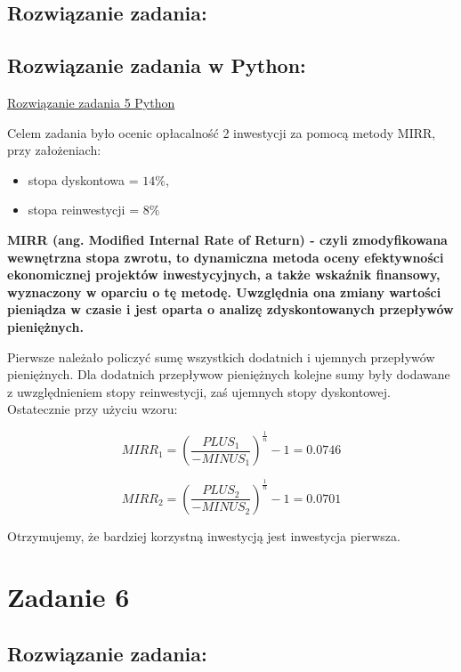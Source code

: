 \documentclass{article}
\begin{document}
	
	\subsection*{Rozwiązanie zadania:}
	
	
	\subsection*{Rozwiązanie zadania w Python:}
	\href{https://github.com/slaw999999999/OEI/blob/main/Zadanie1.ipynb}{Rozwiązanie zadania 5 Python}
	
	Celem zadania było ocenic opłacalność 2 inwestycji za pomocą metody MIRR, przy założeniach:
	
	\begin{itemize}
		\item 
		stopa
		dyskontowa = 
		$14 \%$,
		
		\item 
		stopa
		reinwestycji = 
		$8 \%$
	\end{itemize}

	\textbf{MIRR (ang. Modified Internal Rate of Return) - czyli zmodyfikowana wewnętrzna stopa zwrotu, to dynamiczna metoda oceny efektywności ekonomicznej projektów inwestycyjnych, a także wskaźnik finansowy, wyznaczony w oparciu o tę metodę. Uwzględnia ona zmiany wartości pieniądza w czasie i jest oparta o analizę zdyskontowanych przepływów pieniężnych.}\newline 
	
	Pierwsze należało policzyć sumę wszystkich dodatnich i ujemnych przepływów pieniężnych. Dla dodatnich przepływow pieniężnych kolejne sumy były dodawane z uwzględnieniem stopy reinwestycji, zaś ujemnych stopy dyskontowej. Ostatecznie przy użyciu wzoru:
	
		$$ MIRR_1 = \left(\frac{PLUS_1}{-MINUS_1}\right)^{\frac{1}{n}}-1 = 0.0746 $$
		
		$$ MIRR_2 = \left(\frac{PLUS_2}{-MINUS_2}\right)^{\frac{1}{n}}-1 = 0.0701 $$
	
	Otrzymujemy, że bardziej korzystną inwestycją jest inwestycja pierwsza.
	\newpage
	\section*{Zadanie 6}
	
	
	\subsection*{Rozwiązanie zadania:}
	
\end{document}

